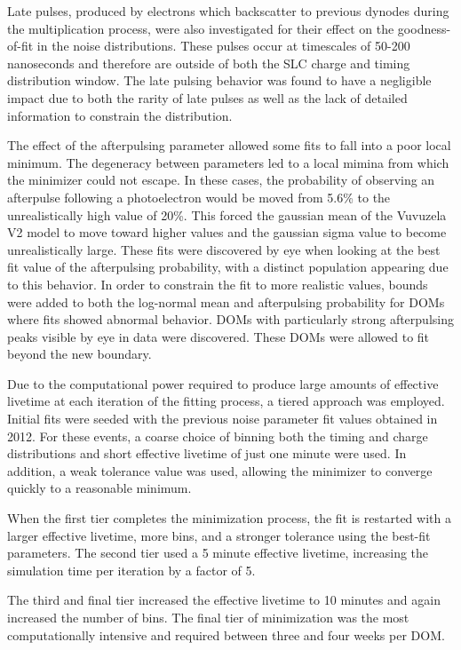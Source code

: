 Late pulses, produced by electrons which backscatter to previous dynodes during the multiplication process, were also investigated for their effect on the goodness-of-fit in the noise distributions.
These pulses occur at timescales of 50-200 nanoseconds and therefore are outside of both the SLC charge and timing distribution window.
The late pulsing behavior was found to have a negligible impact due to both the rarity of late pulses as well as the lack of detailed information to constrain the distribution.

The effect of the afterpulsing parameter allowed some fits to fall into a poor local minimum. 
The degeneracy between parameters led to a local mimina from which the minimizer could not escape.
In these cases, the probability of observing an afterpulse following a photoelectron would be moved from 5.6\% to the unrealistically high value of 20\%. 
This forced the gaussian mean of the Vuvuzela V2 model to move toward higher values and the gaussian sigma value to become unrealistically large.
These fits were discovered by eye when looking at the best fit value of the afterpulsing probability, with a distinct population appearing due to this behavior.
In order to constrain the fit to more realistic values, bounds were added to both the log-normal mean and afterpulsing probability for DOMs where fits showed abnormal behavior. 
DOMs with particularly strong afterpulsing peaks visible by eye in data were discovered.
These DOMs were allowed to fit beyond the new boundary.

Due to the computational power required to produce large amounts of effective livetime at each iteration of the fitting process, a tiered approach was employed.
Initial fits were seeded with the previous noise parameter fit values obtained in 2012.
For these events, a coarse choice of binning both the timing and charge distributions and short effective livetime of just one minute were used.
In addition, a weak tolerance value was used, allowing the minimizer to converge quickly to a reasonable minimum.

When the first tier completes the minimization process, the fit is restarted with a larger effective livetime, more bins, and a stronger tolerance using the best-fit parameters.
The second tier used a 5 minute effective livetime, increasing the simulation time per iteration by a factor of 5.

The third and final tier increased the effective livetime to 10 minutes and again increased the number of bins.
The final tier of minimization was the most computationally intensive and required between three and four weeks per DOM. 

